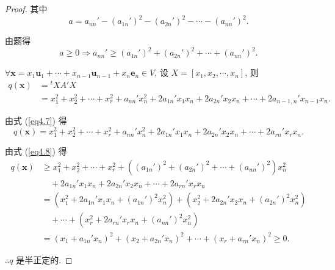 \documentclass[color=black,device=normal,lang=cn,mode=geye]{elegantnote}
\begin{document}
\begin{proof}
    其中
    \[a=a_{nn}'-(a_{1n}')^2-(a_{2n}')^2-\cdots-(a_{nn}')^2.\]

    由题得
    \begin{equation}\label{eq4.8}
        a\geq0\Rightarrow a_{nn}'\geq(a_{1n}')^2+(a_{2n}')^2+\cdots+(a_{nn}')^2.
    \end{equation}

    $\forall\boldsymbol{x}=x_1\boldsymbol{u}_1+\cdots+x_{n-1}\boldsymbol{u}_{n-1}+x_n\boldsymbol{e}_n\in V$, 设 $X=[x_1,x_2,\cdots,x_n]$, 则
    \begin{align*}
        q(\boldsymbol{x}) & ={}^tXA'X \\
        & =x^2_1+x^2_2+\cdots+x^2_r+a_{nn}'x_n^2+2a_{1n}'x_1x_n+2a_{2n}'x_2x_n+\cdots+2a_{n-1,n}'x_{n-1}x_n.
    \end{align*}

    由式 (\ref{eq4.7}) 得
    \[q(\boldsymbol{x})=x^2_1+x^2_2+\cdots+x^2_r+a_{nn}'x_n^2+2a_{1n}'x_1x_n+2a_{2n}'x_2x_n+\cdots+2a_{rn}'x_rx_n.\]

    由式 (\ref{eq4.8}) 得
    \begin{align*}
        q(\boldsymbol{x}) & \geq x^2_1+x^2_2+\cdots+x^2_r+((a_{1n}')^2+(a_{2n}')^2+\cdots+(a_{nn}')^2)x_n^2 \\
        & \quad+2a_{1n}'x_1x_n+2a_{2n}'x_2x_n+\cdots+2a_{rn}'x_rx_n \\
        & =(x^2_1+2a_{1n}'x_1x_n+(a_{1n}')^2x_n^2)+(x^2_2+2a_{2n}'x_2x_n+(a_{2n}')^2x_n^2) \\
        & \quad+\cdots+(x^2_r+2a_{rn}'x_rx_n+(a_{nn}')^2x_n^2) \\
        & =(x_1+a_{1n}'x_n)^2+(x_2+a_{2n}'x_n)^2+\cdots+(x_r+a_{rn}'x_n)^2\geq0.
    \end{align*}

    $\therefore q$ 是半正定的.
\end{proof}
\end{document}
